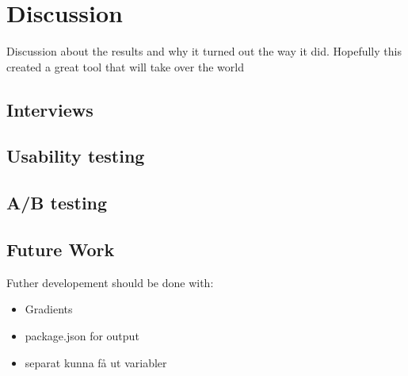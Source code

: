 \section{Discussion}
Discussion about the results and why it turned out the way it did. Hopefully this created a great tool that will take over the world


\subsection{Interviews}%
\label{sub:Interviews}

\subsection{Usability testing}%
\label{sub:Usability testing}

\subsection{A/B testing}%
\label{sub:A/B testing}


\subsection{Future Work}%
\label{sub:Future Work}
Futher developement should be done with:
\begin{itemize}
   \item Gradients
   \item package.json for output
   \item separat kunna få ut variabler 
\end{itemize}

